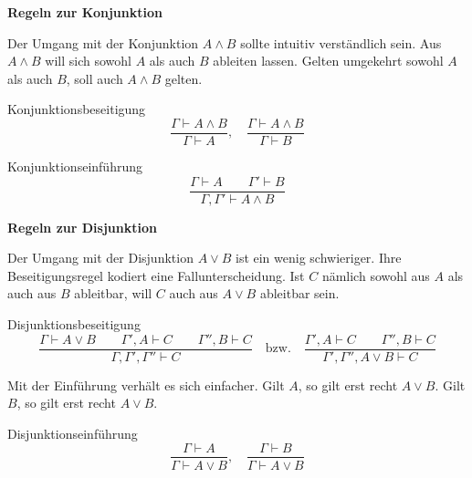 \documentclass[8pt]{beamer}
\newcommand{\strong}[1]{\textsf{\textbf{#1}}}
\newcommand{\parspace}{\vspace{0.8em}}
\begin{document}
\begin{frame}[t]
\vspace{0.5em}
\strong{Regeln zur Konjunktion}

\parspace
Der Umgang mit der Konjunktion $A\land B$ sollte intuitiv verständlich
sein. Aus $A\land B$ will sich sowohl $A$ als auch $B$ ableiten lassen.
Gelten umgekehrt sowohl $A$ als auch $B$, soll auch $A\land B$ gelten.

\begin{block}{Konjunktionsbeseitigung}
\[\dfrac{\Gamma\vdash A\land B}{\Gamma\vdash A},\quad
\dfrac{\Gamma\vdash A\land B}{\Gamma\vdash B}\]
\end{block}

\begin{block}{Konjunktionseinführung}
\[\dfrac{\Gamma\vdash A\qquad\Gamma'\vdash B}{\Gamma,\Gamma'\vdash A\land B}\]
\end{block}
\end{frame}

\begin{frame}[t]
\vspace{0.5em}
\strong{Regeln zur Disjunktion}

\parspace
Der Umgang mit der Disjunktion $A\lor B$ ist ein wenig schwieriger.
Ihre Beseitigungsregel kodiert eine Fallunterscheidung. Ist $C$
nämlich sowohl aus $A$ als auch aus $B$ ableitbar, will $C$ auch aus
$A\lor B$ ableitbar sein.

\begin{block}{Disjunktionsbeseitigung}
\[\dfrac{\Gamma\vdash A\lor B\qquad\Gamma',A\vdash C\qquad\Gamma'',B\vdash C}
{\Gamma,\Gamma',\Gamma''\vdash C}
\quad\text{bzw.}\quad
\dfrac{\Gamma',A\vdash C\qquad\Gamma'',B\vdash C}
{\Gamma',\Gamma'',A\lor B\vdash C}\]
\end{block}

Mit der Einführung verhält es sich einfacher. Gilt $A$, so gilt erst
recht $A\lor B$. Gilt $B$, so gilt erst recht $A\lor B$.

\begin{block}{Disjunktionseinführung}
\[\dfrac{\Gamma\vdash A}{\Gamma\vdash A\lor B},\quad
\dfrac{\Gamma\vdash B}{\Gamma\vdash A\lor B}\]
\end{block}
\end{frame}
\end{document}
